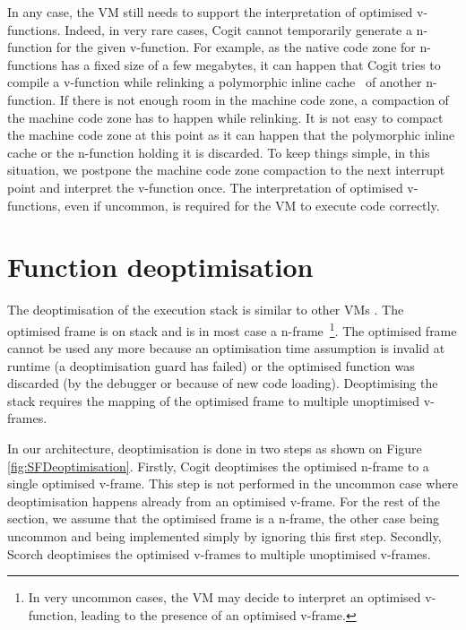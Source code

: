 \documentclass[a4paper,12pt,twoside]{../includes/ThesisStyle}
\begin{document}
In any case, the VM still needs to support the interpretation of optimised v-functions. Indeed, in very rare cases, Cogit cannot temporarily generate a n-function for the given v-function. For example, as the native code zone for n-functions has a fixed size of a few megabytes, it can happen that Cogit tries to compile a v-function while relinking a polymorphic inline cache~\cite{Holz91a} of another n-function. If there is not enough room in the machine code zone, a compaction of the machine code zone has to happen while relinking. It is not easy to compact the machine code zone at this point as it can happen that the polymorphic inline cache or the n-function holding it is discarded. To keep things simple, in this situation, we postpone the machine code zone compaction to the next interrupt point and interpret the v-function once. The interpretation of optimised v-functions, even if uncommon, is required for the VM to execute code correctly.  


\section {Function deoptimisation}
\label{sec:functionDeoptimisation}

The deoptimisation of the execution stack is similar to other VMs \cite{Fin03a, Holz92a}. The optimised frame is on stack and is in most case a n-frame~\footnote{In very uncommon cases, the VM may decide to interpret an optimised v-function, leading to the presence of an optimised v-frame.}. The optimised frame cannot be used any more because an optimisation time assumption is invalid at runtime (a deoptimisation guard has failed) or the optimised function was discarded (by the debugger or because of new code loading). Deoptimising the stack requires the mapping of the optimised frame to multiple unoptimised v-frames. 

In our architecture, deoptimisation is done in two steps as shown on Figure \ref{fig:SFDeoptimisation}. Firstly, Cogit deoptimises the optimised n-frame to a single optimised v-frame. This step is not performed in the uncommon case where deoptimisation happens already from an optimised v-frame. For the rest of the section, we assume that the optimised frame is a n-frame, the other case being uncommon and being implemented simply by ignoring this first step. Secondly, Scorch deoptimises the optimised v-frames to multiple unoptimised v-frames.
\end{document}
